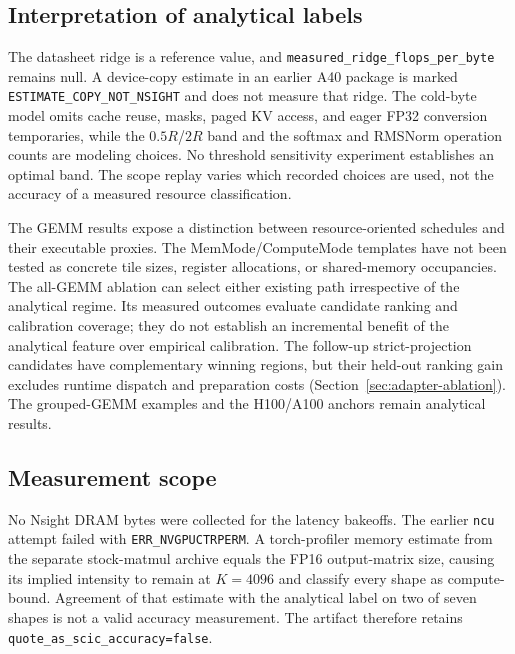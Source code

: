 \documentclass[a4paper,fleqn]{cas-dc}
\begin{document}
\subsection{Interpretation of analytical labels}

The datasheet ridge is a reference value, and \texttt{measured\_\allowbreak ridge\_\allowbreak flops\_\allowbreak per\_\allowbreak byte} remains null.
A device-copy estimate in an earlier A40 package is marked \texttt{ESTIMATE\_\allowbreak COPY\_\allowbreak NOT\_\allowbreak NSIGHT} and does not measure that ridge.
The cold-byte model omits cache reuse, masks, paged KV access, and eager FP32 conversion temporaries, while the $0.5R$/$2R$ band and the softmax and RMSNorm operation counts are modeling choices.
No threshold sensitivity experiment establishes an optimal band.
The scope replay varies which recorded choices are used, not the accuracy of a measured resource classification.

The GEMM results expose a distinction between resource-oriented schedules and their executable proxies.
The MemMode/ComputeMode templates have not been tested as concrete tile sizes, register allocations, or shared-memory occupancies.
The all-GEMM ablation can select either existing path irrespective of the analytical regime.
Its measured outcomes evaluate candidate ranking and calibration coverage; they do not establish an incremental benefit of the analytical feature over empirical calibration.
The follow-up strict-projection candidates have complementary winning regions, but their held-out ranking gain excludes runtime dispatch and preparation costs (Section~\ref{sec:adapter-ablation}).
The grouped-GEMM examples and the H100/A100 anchors remain analytical results.

\subsection{Measurement scope}

No Nsight DRAM bytes were collected for the latency bakeoffs.
The earlier \texttt{ncu} attempt failed with \texttt{ERR\_NVGPUCTRPERM}.
A torch-profiler memory estimate from the separate stock-matmul archive equals the FP16 output-matrix size, causing its implied intensity to remain at $K{=}4096$ and classify every shape as compute-bound.
Agreement of that estimate with the analytical label on two of seven shapes is not a valid accuracy measurement.
The artifact therefore retains \texttt{quote\_\allowbreak as\_\allowbreak scic\_\allowbreak accuracy=false}.
\end{document}
